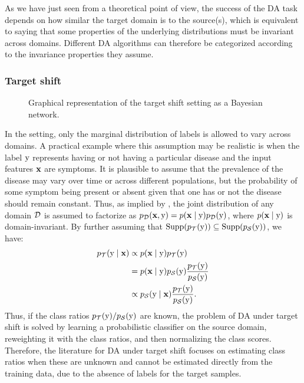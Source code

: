 As we have just seen from a theoretical point of view, the success of the DA task depends on how similar the target domain is to the source(s), which is equivalent to saying that some properties of the underlying distributions must be invariant across domains. Different DA algorithms can therefore be categorized according to the invariance properties they assume.

\subsubsection{Target shift}
\label{sec:target_shift_sota}
\begin{figure}
    \centering
    \caption{Graphical representation of the target shift setting as a Bayesian network.}
    \label{fig:target_shift}
\end{figure}
In the  setting, only the marginal distribution of labels is allowed to vary across domains. A practical example where this assumption may be realistic is when the label ${\textnormal{y}}$ represents having or not having a particular disease and the input features ${\mathbf{x}}$ are symptoms. It is plausible to assume that the prevalence of the disease may vary over time or across different populations, but the probability of some symptom being present or absent given that one has or not the disease should remain constant. Thus, as implied by , the joint distribution of any domain ${\mathcal{D}}$ is assumed to factorize as $p_{\mathcal{D}}({\mathbf{x}}, {\textnormal{y}}) = p({\mathbf{x}} \mid {\textnormal{y}}) p_{\mathcal{D}}({\textnormal{y}})$, where $p({\mathbf{x}} \mid {\textnormal{y}})$ is domain-invariant. By further assuming that $\mathrm{Supp}(p_{\mathcal{T}}({\textnormal{y}})) \subseteq \mathrm{Supp}(p_{\mathcal{S}}({\textnormal{y}}))$, we have:
\begin{align}
    p_{\mathcal{T}}({\textnormal{y}} \mid {\mathbf{x}}) &\propto p({\mathbf{x}} \mid {\textnormal{y}}) p_{\mathcal{T}}({\textnormal{y}}) \nonumber\\
    &= p({\mathbf{x}} \mid {\textnormal{y}}) p_{\mathcal{S}}({\textnormal{y}}) \frac{p_{\mathcal{T}}({\textnormal{y}})}{p_{\mathcal{S}}({\textnormal{y}})} \nonumber\\
    &\propto p_{\mathcal{S}}({\textnormal{y}} \mid {\mathbf{x}}) \frac{p_{\mathcal{T}}({\textnormal{y}})}{p_{\mathcal{S}}({\textnormal{y}})}.
\end{align}
Thus, if the class ratios $p_{\mathcal{T}}({\textnormal{y}})/p_{\mathcal{S}}({\textnormal{y}})$ are known, the problem of DA under target shift is solved by learning a probabilistic classifier on the source domain, reweighting it with the class ratios, and then normalizing the class scores. Therefore, the literature for DA under target shift focuses on estimating class ratios when these are unknown and cannot be estimated directly from the training data, due to the absence of labels for the target samples.

